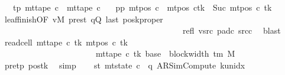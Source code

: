 \begin{isabellebody}
\ \ \ tp{}{\isacharcolon}{\kern0pt}\ {\isachardoublequoteopen}mt{\isacharunderscore}{\kern0pt}tape\ c{}\ {\isacharequal}{\kern0pt}\ mt{\isacharunderscore}{\kern0pt}tape\ c{}{\isachardoublequoteclose}\isanewline
\ \ \ pp{}{\isacharcolon}{\kern0pt}\ {\isachardoublequoteopen}mt{\isacharunderscore}{\kern0pt}pos\ c{}\ {\isacharequal}{\kern0pt}\ {\isacharparenleft}{\kern0pt}mt{\isacharunderscore}{\kern0pt}pos\ c{}{\isacharparenright}{\kern0pt}{\isacharparenleft}{\kern0pt}tk\ {\isacharcolon}{\kern0pt}{\isacharequal}{\kern0pt}\ Suc\ {\isacharparenleft}{\kern0pt}mt{\isacharunderscore}{\kern0pt}pos\ c{}\ tk{\isacharparenright}{\kern0pt}{\isacharparenright}{\kern0pt}{\isachardoublequoteclose}\isanewline
\ \ \ \ \isamarkupfalse%
\ leaf{\isacharunderscore}{\kern0pt}finish{\isacharbrackleft}{\kern0pt}OF\ vM\ pre{\isacharunderscore}{\kern0pt}st\ qQ\ last\ posk{\isacharprime}{\kern0pt}{\isacharunderscore}{\kern0pt}proper\isanewline
\ \ \ \ \ \ \ \ \ \ \ \ \ \ \ \ \ \ \ \ \ \ \ \ \ \ \ \ \ \ \ \ \ \ \ \ \ \ \ \ \ \ \ \ refl\ vsrc{}\ pad{\isacharunderscore}{\kern0pt}c{}\ src{\isacharunderscore}{\kern0pt}c{}{\isacharbrackright}{\kern0pt}\ \isamarkupfalse%
\ blast\isanewline
\ \ \isamarkupfalse%
\ read{\isacharunderscore}{\kern0pt}cell{}{\isacharcolon}{\kern0pt}\ {\isachardoublequoteopen}mt{\isacharunderscore}{\kern0pt}tape\ c{}\ tk\ {\isacharparenleft}{\kern0pt}mt{\isacharunderscore}{\kern0pt}pos\ c{}\ tk{\isacharparenright}{\kern0pt}\isanewline
\ \ \ \ \ \ \ \ \ \ \ \ \ \ \ \ \ \ \ \ \ \ {\isacharequal}{\kern0pt}\ mt{\isacharunderscore}{\kern0pt}tape\ c{\isacharprime}{\kern0pt}\ tk\ {\isacharparenleft}{\kern0pt}base\ {\isacharplus}{\kern0pt}\ {\isacharparenleft}{\kern0pt}block{\isacharunderscore}{\kern0pt}width\ {\isacharparenleft}{\kern0pt}{\isasymGamma}{\isacharunderscore}{\kern0pt}tm\ M{\isacharparenright}{\kern0pt}\ {\isacharminus}{\kern0pt}\ {}{\isacharparenright}{\kern0pt}{\isacharparenright}{\kern0pt}{\isachardoublequoteclose}\isanewline
\ \ \ \ \isamarkupfalse%
\ pre{\isacharunderscore}{\kern0pt}tp\ pos{}{\isacharunderscore}{\kern0pt}tk\ \isamarkupfalse%
\ simp\isanewline
\ \ \isamarkupfalse%
\ st{}{\isacharprime}{\kern0pt}{\isacharcolon}{\kern0pt}\ {\isachardoublequoteopen}mt{\isacharunderscore}{\kern0pt}state\ c{}\ {\isacharequal}{\kern0pt}\ {\isacharparenleft}{\kern0pt}q{\isacharcomma}{\kern0pt}\ AR{\isacharunderscore}{\kern0pt}SimCompute{\isacharcomma}{\kern0pt}\ k{\isacharunderscore}{\kern0pt}unidx\ {}{\isacharcomma}{\kern0pt}\ {}{\isacharcomma}{\kern0pt}\isanewline

\end{isabellebody}
